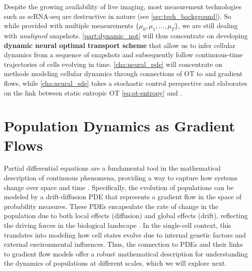 Despite the growing availability of live imaging, most measurement technologies such as \acrshort{sc}\acrshort{RNA-seq} are destructive in nature (see \cref{sec:tech_background}).
So while provided with multiple measurements $\{ \mu_0, \mu_1, \dots, \mu_T \}$, we are still dealing with \emph{unaligned} snapshots.
\cref{part:dynamic_not} will thus concentrate on developing \textbf{dynamic neural optimal transport scheme} that allow us to infer cellular dynamics from a sequence of snapshots and subsequently follow continuous-time trajectories of cells evolving in time.
\cref{cha:neural_pde} will concentrate on methods modeling cellular dynamics through connections of \acrlong{OT} to  and gradient flows, while \cref{cha:neural_sde} takes a stochastic control perspective and elaborates on the link between static entropic OT \eqref{eq:ot-entropy} and .


\section{Population Dynamics as Gradient Flows}

Partial differential equations are a fundamental tool in the mathematical description of continuous phenomena, providing a way to capture how systems change over space and time \citep{risken1996fokker}. 
Specifically, the evolution of populations can be modeled by a drift-diffusion PDE that represents a gradient flow in the space of probability measures.
These PDEs encapsulate the rate of change in the population due to both local effects (diffusion) and global effects (drift), reflecting the driving forces in the biological landscape \citep{teschendorff2021statistical, weinreb2018fundamental}.
In the single-cell context, this translates into modeling how cell states evolve due to internal genetic factors and external environmental influences. Thus, the connection to PDEs and their links to gradient flow models offer a robust mathematical description for understanding the dynamics of populations at different scales, which we will explore next.

